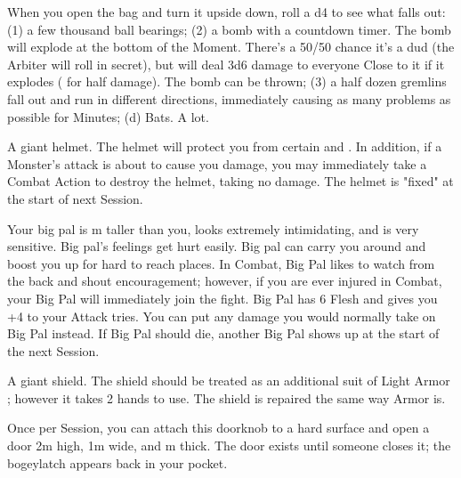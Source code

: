 \begin{multicols*}{2}\raggedcolumns


When you open the bag and turn it upside down, roll a d4 to see what falls out:  (1) a few thousand ball bearings; (2) a bomb with a countdown timer.  The bomb will explode at the bottom of the  Moment.  There's a 50/50 chance it's a dud (the Arbiter will roll in secret), but will deal 3d6 damage to everyone Close to it if it explodes ( for half damage).  The bomb can be thrown;  (3) a half dozen gremlins fall out and run in different directions, immediately causing as many problems as possible for Minutes; (d)  Bats. A lot.



A giant helmet.  The helmet will protect you from certain  and .  In addition, if a Monster's attack is about to cause you  damage, you may immediately take a Combat Action to destroy the helmet, taking no damage.  The helmet is "fixed" at the start of next Session.



Your big pal is \OneHalf m taller than you, looks extremely intimidating, and is very sensitive.  Big pal's feelings get hurt easily.  Big pal can carry you around and boost you up for hard to reach places.  In Combat, Big Pal likes to watch from the back and shout encouragement; however, if you are ever injured in Combat, your Big Pal will immediately join the fight.  Big Pal has 6 Flesh and gives you +4 to your Attack \RO tries.  You can put any damage you would normally take on Big Pal instead.  If Big Pal should die, another Big Pal shows up at the start of the next Session.




A giant shield.  The shield should be treated as an additional suit of Light Armor ; however it takes 2 hands to use.  The shield is repaired the same way Armor is.


Once per Session, you can attach this doorknob to a hard surface and open a door 2m high, 1m wide, and \OneHalf m thick.  The door exists until someone closes it; the bogeylatch appears back in your pocket.


\end{multicols*}
